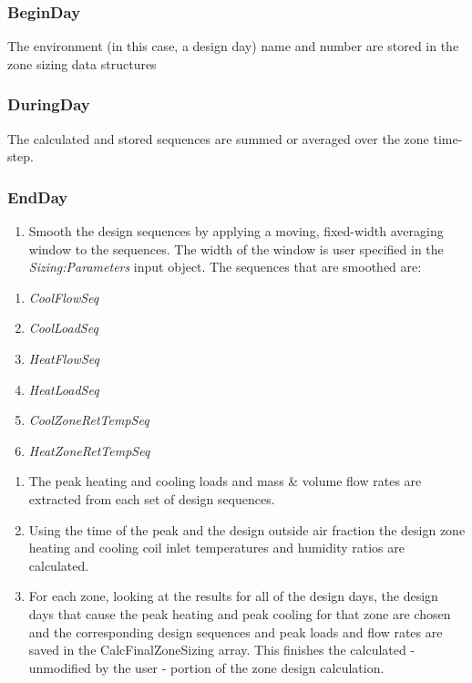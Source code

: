 \subsubsection{BeginDay}\label{beginday-000}

The environment (in this case, a design day) name and number are stored in the zone sizing data structures

\subsubsection{DuringDay}\label{duringday-000}

The calculated and stored sequences are summed or averaged over the zone time-step.

\subsubsection{EndDay}\label{endday-000}

\begin{enumerate}
\def\labelenumi{(\arabic{enumi})}
\tightlist
\item
  Smooth the design sequences by applying a moving, fixed-width averaging window to the sequences. The width of the window is user specified in the \emph{Sizing:Parameters} input object. The sequences that are smoothed are: 
\end{enumerate}

\begin{enumerate}
\def\labelenumi{(\alph{enumi})}
\item
  \emph{CoolFlowSeq}
\item
  \emph{CoolLoadSeq}
\item
  \emph{HeatFlowSeq}
\item
  \emph{HeatLoadSeq}
\item
  \emph{CoolZoneRetTempSeq}
\item
  \emph{HeatZoneRetTempSeq} 
\end{enumerate}

\begin{enumerate}
\def\labelenumi{(\arabic{enumi})}
\setcounter{enumi}{1}
\item
  The peak heating and cooling loads and mass \& volume flow rates are extracted from each set of design sequences.
\item
  Using the time of the peak and the design outside air fraction the design zone heating and cooling coil inlet temperatures and humidity ratios are calculated.
\item
  For each zone, looking at the results for all of the design days, the design days that cause the peak heating and peak cooling for that zone are chosen and the corresponding design sequences and peak loads and flow rates are saved in the CalcFinalZoneSizing array. This finishes the calculated - unmodified by the user - portion of the zone design calculation.
\end{enumerate}

